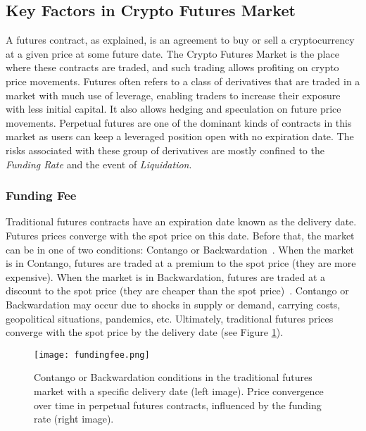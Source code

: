 \subsection{Key Factors in Crypto Futures Market}\label{appx:futures}
A futures contract, as explained, is an agreement to buy or sell a cryptocurrency at a given price at some future date. The Crypto Futures Market is the place where these contracts are traded, and such trading allows profiting on crypto price movements. Futures often refers to a class of derivatives that are traded in a market with much use of leverage, enabling traders to increase their exposure with less initial capital. It also allows hedging and speculation on future price movements. Perpetual futures are one of the dominant kinds of contracts in this market as users can keep a leveraged position open with no expiration date. The risks associated with these group of derivatives are mostly confined to the \textsl{Funding Rate} and the event of \textsl{Liquidation}.

\subsubsection{Funding Fee}\label{appx:funding}
Traditional futures contracts have an expiration date known as the delivery date. Futures prices converge with the spot price on this date. Before that, the market can be in one of two conditions: Contango or Backwardation~\cite{cme2020contango}. When the market is in Contango, futures are traded at a premium to the spot price (\ie they are more expensive). When the market is in Backwardation, futures are traded at a discount to the spot price (\ie they are cheaper than the spot price)~\cite{abd2019contango}. Contango or Backwardation may occur due to shocks in supply or demand, carrying costs, geopolitical situations, pandemics, etc. Ultimately, traditional futures prices converge with the spot price by the delivery date (see Figure \ref{fig:fundingfee}).

\begin{figure}[t]
	\centering
	\texttt{[image: fundingfee.png]}
	\caption[Price convergence in the Futures market vs. Perpetuals]{Contango or Backwardation conditions in the traditional futures market with a specific delivery date (left image). Price convergence over time in perpetual futures contracts, influenced by the funding rate (right image).}
	\label{fig:fundingfee}
\end{figure}

